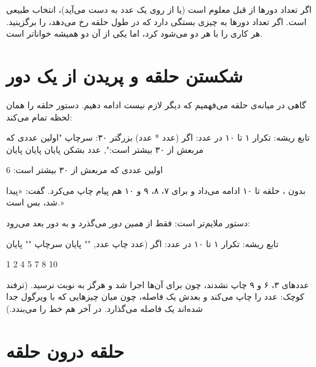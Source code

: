 \begin{note}
اگر تعداد دورها از قبل معلوم است (یا از روی یک عدد به دست می‌آید)،
 انتخاب طبیعی است. اگر تعداد دورها به چیزی بستگی دارد که در
طول حلقه رخ می‌دهد،  را برگزینید. هر کاری را با هر دو می‌شود
کرد، اما یکی از آن دو همیشه خواناتر است.
\end{note}

\section{شکستن حلقه و پریدن از یک دور}

گاهی در میانه‌ی حلقه می‌فهمیم که دیگر لازم نیست ادامه دهیم. دستور
 حلقه را همان لحظه تمام می‌کند:

\begin{salamfa}
تابع ریشه:
    تکرار ۱ تا ۱۰ در عدد:
        اگر (عدد * عدد) بزرگتر ۳۰:
            سرچاپ "اولین عددی که مربعش از ۳۰ بیشتر است:", عدد
            بشکن
        پایان
    پایان
پایان
\end{salamfa}

\begin{outputfa}
اولین عددی که مربعش از ۳۰ بیشتر است: 6
\end{outputfa}

بدون ، حلقه تا ۱۰ ادامه می‌داد و برای ۷، ۸، ۹ و ۱۰ هم پیام
چاپ می‌کرد.  گفت: «پیدا شد، بس است.»

دستور  ملایم‌تر است: فقط از \emph{همین دور} می‌گذرد و به دور
بعد می‌رود:

\begin{salamfa}
تابع ریشه:
    تکرار ۱ تا ۱۰ در عدد:
        اگر (عدد %
        چاپ عدد, ""
    پایان
    سرچاپ ""
پایان
\end{salamfa}

\begin{outputfa}
1 2 4 5 7 8 10
\end{outputfa}

عددهای ۳، ۶ و ۹ چاپ نشدند، چون برای آن‌ها  اجرا شد و
 هرگز به نوبت نرسید. (ترفند کوچک: 
عدد را چاپ می‌کند و بعدش یک فاصله، چون میان چیزهایی که با ویرگول جدا
شده‌اند یک فاصله می‌گذارد.  در آخر هم خط را می‌بندد.)

\section{حلقه درون حلقه}

